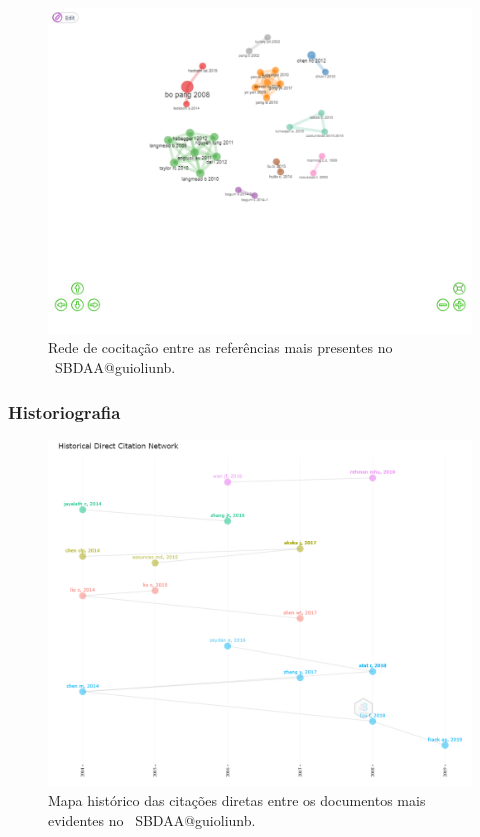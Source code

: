 \begin{figure}
    \centering
    \includegraphics[width=1\textwidth]{experiments/guioliunb/AnaliseBibliometrica/SocialBigDataAnalysis/CO CITATION NETWORK.png}
    \caption{Rede de cocitação entre as referências mais presentes no  \dataset\ SBDAA@guioliunb.}
    \label{fig:MASSA2-CoCitation-Network}
\end{figure}

\subsubsection{Historiografia}






\begin{figure}
    \centering
    \includegraphics[width=1\textwidth]{experiments/guioliunb/AnaliseBibliometrica/SocialBigDataAnalysis/historiograph.png}
    \caption{Mapa histórico das citações diretas entre os documentos mais evidentes no  \dataset\ SBDAA@guioliunb.}
    \label{fig:MASSA2-HistoricalDirectCitationNetwork-100docs}
\end{figure}




